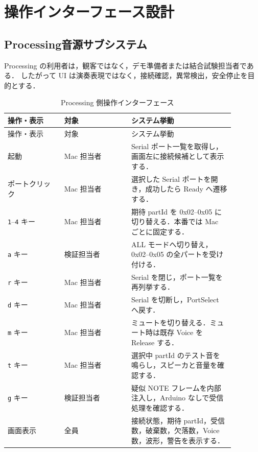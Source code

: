 \documentclass[lualatex,book,paper=a4paper,jafontsize=11.5pt,jafontscale=1.05]{jlreq}
\begin{document}
\section{操作インターフェース設計}
\subsection{Processing音源サブシステム}
Processing の利用者は，観客ではなく，デモ準備者または結合試験担当者である．
したがって UI は演奏表現ではなく，接続確認，異常検出，安全停止を目的とする．

\begin{longtable}{p{0.22\linewidth}p{0.26\linewidth}p{0.40\linewidth}}
\caption{Processing 側操作インターフェース}\label{tab:ui}\\
\toprule
操作・表示 & 対象 & システム挙動 \\
\midrule
\endfirsthead
\toprule
操作・表示 & 対象 & システム挙動 \\
\midrule
\endhead
起動 & Mac 担当者 & Serial ポート一覧を取得し，画面左に接続候補として表示する． \\
ポートクリック & Mac 担当者 & 選択した Serial ポートを開き，成功したら Ready へ遷移する． \\
\texttt{1}--\texttt{4} キー & Mac 担当者 & 期待 partId を 0x02--0x05 に切り替える．本番では Mac ごとに固定する． \\
\texttt{a} キー & 検証担当者 & ALL モードへ切り替え，0x02--0x05 の全パートを受け付ける． \\
\texttt{r} キー & Mac 担当者 & Serial を閉じ，ポート一覧を再列挙する． \\
\texttt{d} キー & Mac 担当者 & Serial を切断し，PortSelect へ戻す． \\
\texttt{m} キー & Mac 担当者 & ミュートを切り替える．ミュート時は既存 Voice を Release する． \\
\texttt{t} キー & Mac 担当者 & 選択中 partId のテスト音を鳴らし，スピーカと音量を確認する． \\
\texttt{g} キー & 検証担当者 & 疑似 NOTE フレームを内部注入し，Arduino なしで受信処理を確認する． \\
画面表示 & 全員 & 接続状態，期待 partId，受信数，破棄数，欠落数，Voice 数，波形，警告を表示する． \\
\bottomrule
\end{longtable}
\end{document}
